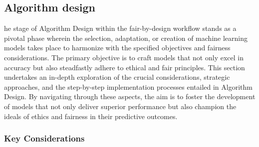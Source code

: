 \subsection{Algorithm design}
\label{subsection:algorithm}

he stage of Algorithm Design within the fair-by-design workflow stands as a pivotal phase wherein the selection, adaptation, or creation of machine learning models takes place to harmonize with the specified objectives and fairness considerations. The primary objective is to craft models that not only excel in accuracy but also steadfastly adhere to ethical and fair principles. This section undertakes an in-depth exploration of the crucial considerations, strategic approaches, and the step-by-step implementation processes entailed in Algorithm Design. By navigating through these aspects, the aim is to foster the development of models that not only deliver superior performance but also champion the ideals of ethics and fairness in their predictive outcomes.

\subsubsection{Key Considerations}

